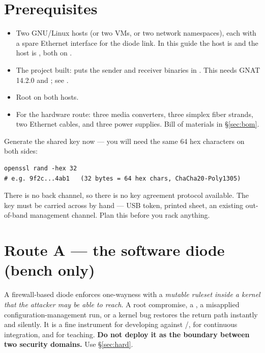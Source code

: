 \documentclass[11pt,a4paper]{article}
\renewcommand{\amp}{\prog{od\_sender}}
\renewcommand{\deamp}{\prog{od\_receiver}}
\begin{document}
\section{Prerequisites}

\begin{itemize}
\item Two GNU/Linux hosts (or two VMs, or two network namespaces), each with a
      spare Ethernet interface for the diode link. In this guide the
      \srcside{} host is  and the \dstside{} host is
      , both on .
\item The project built:  puts the sender and
      receiver binaries in . This needs GNAT 14.2.0 and
      ; see .
\item Root on both hosts.
\item For the hardware route: three media converters, three simplex fiber
      strands, two Ethernet cables, and three power supplies. Bill of
      materials in \S\ref{sec:bom}.
\end{itemize}

Generate the shared key now --- you will need the same 64 hex characters on
both sides:

\begin{lstlisting}[style=shell]
openssl rand -hex 32
# e.g. 9f2c...4ab1   (32 bytes = 64 hex chars, ChaCha20-Poly1305)
\end{lstlisting}

\begin{warnbox}
There is no back channel, so there is no key agreement protocol available.
The key must be carried across by hand --- USB token, printed sheet, an
existing out-of-band management channel. Plan this before you rack anything.
\end{warnbox}

\section{Route A --- the software diode (bench only)}
\label{sec:soft}

\begin{labbox}
A firewall-based diode enforces one-wayness with a \emph{mutable ruleset
inside a kernel that the attacker may be able to reach}. A root compromise,
a , a misapplied configuration-management run, or a
kernel bug restores the return path instantly and silently. It is a fine
instrument for developing against \amp{}/\deamp{}, for continuous
integration, and for teaching. \textbf{Do not deploy it as the boundary
between two security domains.} Use \S\ref{sec:hard}.
\end{labbox}
\end{document}
